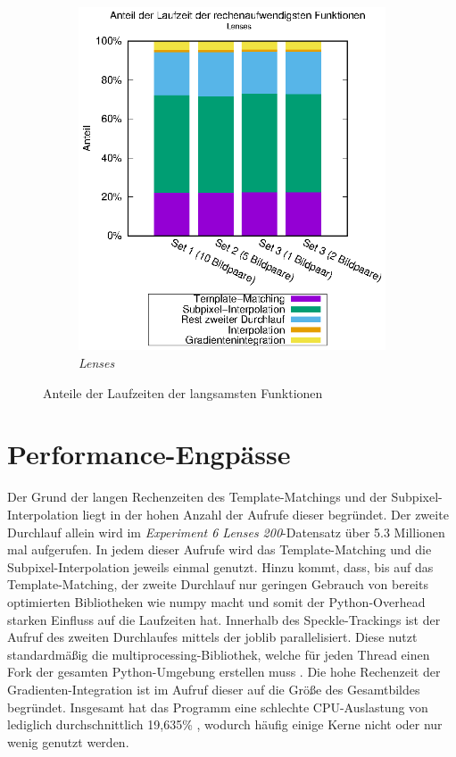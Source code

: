 \begin{center}
\begin{figure}[htbp]
\begin{subfigure}[b]{0.5\textwidth}
			\includegraphics[width=\textwidth]{pdf/slow_lenses}
			\caption{\textit{Lenses}}
			\label{fig:perc_slow_lenses}
		\end{subfigure}
		\caption{Anteile der Laufzeiten der langsamsten Funktionen}
		\label{fig:perc_slow}
	\end{figure}
\end{center}

\section{Performance-Engpässe}

Der Grund der langen Rechenzeiten des Template-Matchings und der Subpixel-Interpolation liegt in der hohen Anzahl der Aufrufe dieser begründet. Der zweite Durchlauf allein wird im \textit{Experiment 6 Lenses 200}-Datensatz über 5.3 Millionen mal aufgerufen. In jedem dieser Aufrufe wird das Template-Matching und die Subpixel-Interpolation jeweils einmal genutzt. Hinzu kommt, dass, bis auf das Temp\-late-Match\-ing, der zweite Durchlauf nur geringen Gebrauch von bereits optimierten Bibliotheken wie numpy macht und somit der Python-Overhead starken Einfluss auf die Laufzeiten hat. Innerhalb des Speckle-Trackings ist der Aufruf des zweiten Durchlaufes mittels der joblib parallelisiert. Diese nutzt standardmäßig die multiprocessing-Bibliothek, welche für jeden Thread einen Fork der gesamten Python-Umgebung erstellen muss \cite{GVB+18}. Die hohe Rechenzeit der Gradienten-Integration ist im Aufruf dieser auf die Größe des Gesamtbildes begründet. Insgesamt hat das Programm eine schlechte CPU-Auslastung von lediglich durchschnittlich 19,635\% \cite{Sch18b}, wodurch häufig einige Kerne nicht oder nur wenig genutzt werden. 

